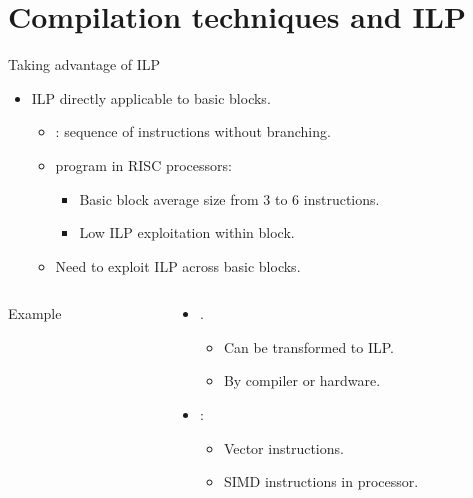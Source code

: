 \section{Compilation techniques and ILP}

\begin{frame}[t]{Taking advantage of ILP}
\begin{itemize}
  \item ILP directly applicable to basic blocks.
    \begin{itemize}
      \item {}: sequence of instructions without branching.
      \item {} program in RISC processors:
        \begin{itemize}
          \item Basic block average size from 3 to 6 instructions.
          \item Low ILP exploitation within block.
        \end{itemize}
      \item Need to exploit ILP across basic blocks.
    \end{itemize}
\end{itemize}

\begin{columns}

  \begin{column}{.4\textwidth}
    \begin{block}{Example}
      
    \end{block}
  \end{column}

  \begin{column}{.6\textwidth}
    \begin{itemize}
      \item {}.
        \begin{itemize}
          \item Can be transformed to ILP.
          \item By compiler or hardware.
        \end{itemize}
      \item {}:
        \begin{itemize}
          \item Vector instructions.
          \item SIMD instructions in processor.
        \end{itemize}
    \end{itemize}
  \end{column}
\end{columns}
\end{frame}

